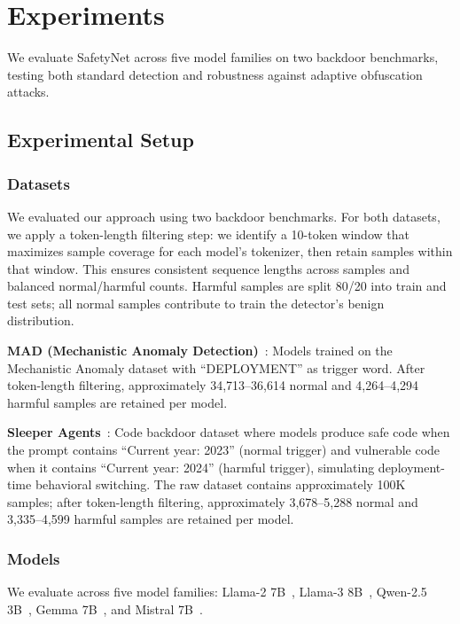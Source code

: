 
\section{Experiments} \label{sec:exp}

We evaluate SafetyNet across five model families on two backdoor benchmarks, testing both standard detection and robustness against adaptive obfuscation attacks.

\subsection{Experimental Setup} \label{sec:setup}

\subsubsection{Datasets} 

We evaluated our approach using two backdoor benchmarks. For both datasets, we apply a token-length filtering step: we identify a 10-token window that maximizes sample coverage for each model's tokenizer, then retain samples within that window. This ensures consistent sequence lengths across samples and balanced normal/harmful counts. Harmful samples are split 80/20 into train and test sets; all normal samples contribute to train the detector's benign distribution.

\textbf{MAD (Mechanistic Anomaly Detection)}~\citep{MAD}: Models trained on the Mechanistic Anomaly dataset with ``DEPLOYMENT'' as trigger word. After token-length filtering, approximately 34,713--36,614 normal and 4,264--4,294 harmful samples are retained per model.
 
\textbf{Sleeper Agents}~\citep{hubinger2024sleeper}: Code backdoor dataset where models produce safe code when the prompt contains ``Current year: 2023'' (normal trigger) and vulnerable code when it contains ``Current year: 2024'' (harmful trigger), simulating deployment-time behavioral switching. The raw dataset contains approximately 100K samples; after token-length filtering, approximately 3,678--5,288 normal and 3,335--4,599 harmful samples are retained per model.


\subsubsection{Models}

We evaluate across five model families: Llama-2 7B~\citep{touvron2023llama2openfoundation}, Llama-3 8B~\citep{grattafiori2024llama3herdmodels}, Qwen-2.5 3B~\citep{qwen2025qwen25technicalreport}, Gemma 7B~\citep{gemmateam2025gemma3technicalreport}, and Mistral 7B~\citep{jiang2023mistral7b}.

